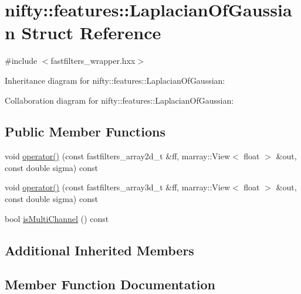\hypertarget{structnifty_1_1features_1_1LaplacianOfGaussian}{}\section{nifty\+:\+:features\+:\+:Laplacian\+Of\+Gaussian Struct Reference}
\label{structnifty_1_1features_1_1LaplacianOfGaussian}


{\ttfamily \#include $<$fastfilters\+\_\+wrapper.\+hxx$>$}



Inheritance diagram for nifty\+:\+:features\+:\+:Laplacian\+Of\+Gaussian\+:


Collaboration diagram for nifty\+:\+:features\+:\+:Laplacian\+Of\+Gaussian\+:
\subsection*{Public Member Functions}
\begin{DoxyCompactItemize}
\item 
void \hyperlink{structnifty_1_1features_1_1LaplacianOfGaussian_ac83a5c2fb54fc120106906a6ad7f4ed8}{operator()} (const fastfilters\+\_\+array2d\+\_\+t \&ff, marray\+::\+View$<$ float $>$ \&out, const double sigma) const 
\item 
void \hyperlink{structnifty_1_1features_1_1LaplacianOfGaussian_a42c4026bf65a2747d04361bc4ebd0c0a}{operator()} (const fastfilters\+\_\+array3d\+\_\+t \&ff, marray\+::\+View$<$ float $>$ \&out, const double sigma) const 
\item 
bool \hyperlink{structnifty_1_1features_1_1LaplacianOfGaussian_a8284b5055a1567105201d3e3ea1b588a}{is\+Multi\+Channel} () const 
\end{DoxyCompactItemize}
\subsection*{Additional Inherited Members}


\subsection{Member Function Documentation}
\hypertarget{structnifty_1_1features_1_1LaplacianOfGaussian_a8284b5055a1567105201d3e3ea1b588a}{}
